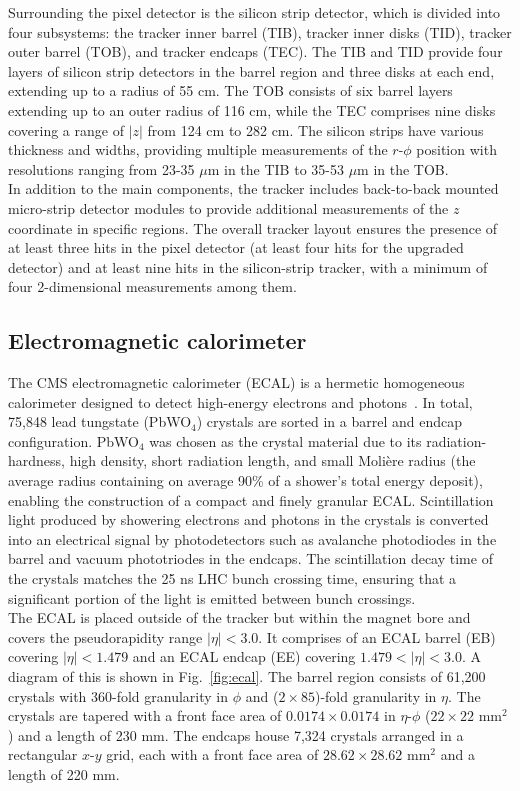 Surrounding the pixel detector is the silicon strip detector, which is divided into four subsystems: the tracker inner barrel (TIB), tracker inner disks (TID), tracker outer barrel (TOB), and tracker endcaps (TEC). 
The TIB and TID provide four layers of silicon strip detectors in the barrel region and three disks at each end, extending up to a radius of 55 cm. 
The TOB consists of six barrel layers extending up to an outer radius of 116 cm, while the TEC comprises nine disks covering a range of $|z|$ from 124 cm to 282 cm. 
The silicon strips have various thickness and widths, providing multiple measurements of the $r$-$\phi$ position with resolutions ranging from 23-35 $\mu$m in the TIB to 35-53 $\mu$m in the TOB. \\

In addition to the main components, the tracker includes back-to-back mounted micro-strip detector modules to provide additional measurements of the $z$ coordinate in specific regions. 
The overall tracker layout ensures the presence of at least three hits in the pixel detector (at least four hits for the upgraded detector) and at least nine hits in the silicon-strip tracker, with a minimum of four 2-dimensional measurements among them.

\subsection{Electromagnetic calorimeter}

The CMS electromagnetic calorimeter (ECAL) is a hermetic homogeneous calorimeter designed to detect high-energy electrons and photons~\cite{CMS_Setup,CMS:2013lxn}. 
In total, 75,848 lead tungstate (PbWO$_4$) crystals are sorted in a barrel and endcap configuration. 
PbWO$_4$ was chosen as the crystal material due to its radiation-hardness, high density, short radiation length, and small Molière radius (the average radius containing on average 90\% of
a shower’s total energy deposit), enabling the construction of a compact and finely granular ECAL. 
Scintillation light produced by showering electrons and photons in the crystals is converted into an electrical signal by photodetectors such as avalanche photodiodes in the barrel and vacuum phototriodes in the endcaps. 
The scintillation decay time of the crystals matches the 25 ns LHC bunch crossing time, ensuring that a significant portion of the light is emitted between bunch crossings. \\

The ECAL is placed outside of the tracker but within the magnet bore and covers the pseudorapidity range $|\eta| < 3.0$. 
It comprises of an ECAL barrel (EB) covering $|\eta| < 1.479$ and an ECAL endcap (EE) covering $1.479 < |\eta| < 3.0$. 
A diagram of this is shown in Fig.~\ref{fig:ecal}.
The barrel region consists of 61,200 crystals with 360-fold granularity in $\phi$ and ($2 \times 85$)-fold granularity in $\eta$. 
The crystals are tapered with a front face area of $0.0174 \times 0.0174$ in $\eta$-$\phi$ ($22 \times 22$ mm$^2$) and a length of 230 mm. 
The endcaps house 7,324 crystals arranged in a rectangular $x$-$y$ grid, each with a front face area of $28.62 \times 28.62$ mm$^2$ and a length of 220 mm. \\

